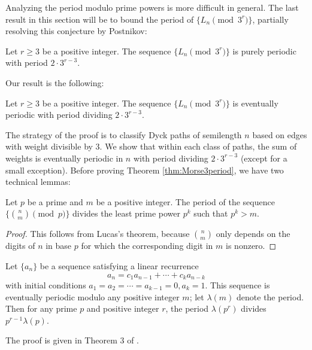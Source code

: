 Analyzing the period modulo prime powers is more difficult in general. The last result in this section will be to bound the period of $\{L_n\pmod{3^r}\}$, partially resolving this conjecture by Postnikov:

\begin{conjecture}
    Let $r\geq 3$ be a positive integer. The sequence $\{L_n\pmod{3^r}\}$ is purely periodic with period $2\cdot 3^{r-3}$.
\end{conjecture}

Our result is the following:
\begin{theorem}
\label{thm:Morse3period}
    Let $r\geq 3$ be a positive integer. The sequence $\{L_n\pmod{3^r}\}$ is eventually periodic with period dividing $2\cdot 3^{r-3}$.
\end{theorem}

The strategy of the proof is to classify Dyck paths of semilength $n$ based on edges with weight divisible by $3$. We show that within each class of paths, the sum of weights is eventually periodic in $n$ with period dividing $2\cdot 3^{r-3}$ (except for a small exception). Before proving Theorem \ref{thm:Morse3period}, we have two technical lemmas:

\begin{lemma}
\label{lem:binomperiod}
    Let $p$ be a prime and $m$ be a positive integer. The period of the sequence $\{\binom{n}{m}\pmod{p}\}$ divides the least prime power $p^k$ such that $p^k >m$.
\end{lemma}
\begin{proof}
    This follows from Lucas's theorem, because $\binom{n}{m}$ only depends on the digits of $n$ in base $p$ for which the corresponding digit in $m$ is nonzero.
\end{proof}

\begin{lemma}
\label{lem:primepowerperiod}
    Let $\{a_n\}$ be a sequence satisfying a linear recurrence
    \[a_n=c_1a_{n-1}+\dotsb+c_ka_{n-k}\]
    with initial conditions $a_1=a_2=\dotsb = a_{k-1}=0, a_{k}=1$. This sequence is eventually periodic modulo any positive integer $m$; let $\lambda(m)$ denote the period. Then for any prime $p$ and positive integer $r$, the period $\lambda(p^r)$ divides $p^{r-1}\lambda(p)$.
\end{lemma}
The proof is given in Theorem 3 of \cite{bright2008periodicity}.

